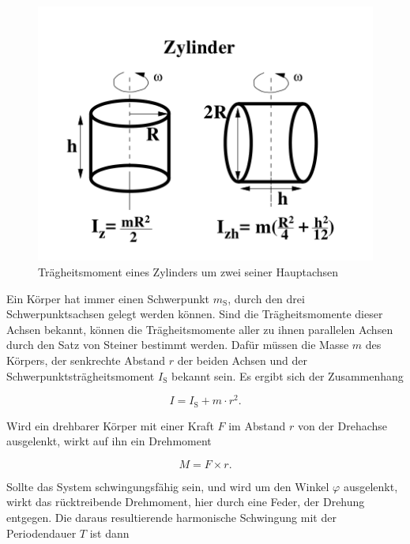 \begin{figure}
    \centering
    \includegraphics[width=\textwidth/2]{images/zylinder.png}
    \caption{Trägheitsmoment eines Zylinders um zwei seiner Hauptachsen \cite{V101}}
    \label{fig:zylinder}
\end{figure}

Ein Körper hat immer einen Schwerpunkt $m_\text{S}$, durch den drei Schwerpunktsachsen gelegt werden können. 
Sind die Trägheitsmomente dieser Achsen bekannt, können die Trägheitsmomente aller zu ihnen parallelen Achsen durch den Satz von Steiner bestimmt werden. 
Dafür müssen die Masse $m$ des Körpers, der senkrechte Abstand $r$ der beiden Achsen und der Schwerpunktsträgheitsmoment $I_\text{S}$ bekannt sein. Es ergibt sich der Zusammenhang 

\begin{equation}
    I = I_\text{S} + m \cdot r^2.
    \label{eq:steiner}
\end{equation}

Wird ein drehbarer Körper mit einer Kraft $F$ im Abstand $r$ von der Drehachse ausgelenkt, wirkt auf ihn ein Drehmoment

\begin{equation}
    M = F \times r.
    \label{eq:drehmoment}
\end{equation}

Sollte das System schwingungsfähig sein, und wird um den Winkel $\varphi$ ausgelenkt, wirkt das rücktreibende Drehmoment, hier durch eine Feder, der Drehung entgegen. Die daraus resultierende harmonische Schwingung mit der Periodendauer $T$ ist dann


